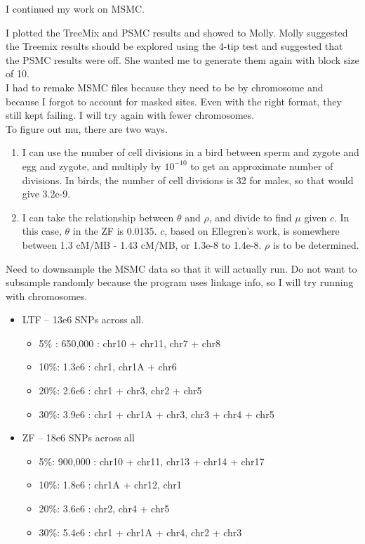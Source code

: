 \documentclass[idxtotoc,hyperref,openany,oneside]{labbook} %
\begin{document}
I continued my work on MSMC.

I plotted the TreeMix and PSMC results and showed to Molly. Molly suggested the Treemix results should be explored using the 4-tip test and suggested that the PSMC results were off. She wanted me to generate them again with block size of 10. \\

I had to remake MSMC files because they need to be by chromosome and because I forgot to account for masked sites. Even with the right format, they still kept failing. I will try again with fewer chromosomes. \\

To figure out mu, there are two ways.
\begin{enumerate}
\item I can use the number of cell divisions in a bird between sperm and zygote and egg and zygote, and multiply by $10^{-10}$ to get an approximate number of divisions. In birds, the number of cell divisions is 32 for males, so that would give 3.2e-9.
\item I can take the relationship between $\theta$ and $\rho$, and divide to find $\mu$ given $c$. In this case, $\theta$ in the ZF is 0.0135. $c$, based on Ellegren's work, is somewhere between 1.3 cM/MB - 1.43 cM/MB, or 1.3e-8 to 1.4e-8. $\rho$ is to be determined. 
\end{enumerate}

Need to downsample the MSMC data so that it will actually run. Do not want to subsample randomly because the program uses linkage info, so I will try running with chromosomes.
\begin{itemize}
\item LTF -- 13e6 SNPs across all.
\begin{itemize}
\item 5\% : 650,000 : chr10  + chr11, chr7 + chr8
\item 10\%: 1.3e6   : chr1, chr1A + chr6 
\item 20\%: 2.6e6   : chr1 + chr3, chr2 + chr5
\item 30\%: 3.9e6   : chr1 + chr1A + chr3, chr3 + chr4 + chr5
\end{itemize}
\item ZF -- 18e6 SNPs across all
\begin{itemize}
\item 5\%:  900,000 : chr10 + chr11, chr13 + chr14 + chr17
\item 10\%: 1.8e6   : chr1A + chr12, chr1
\item 20\%: 3.6e6   : chr2, chr4 + chr5
\item 30\%: 5.4e6   : chr1 + chr1A + chr4, chr2 + chr3
\end{itemize}
\end{itemize}
\end{document}
